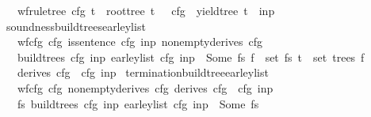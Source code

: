 \begin{isabellebody}
\ \ \ {\isachardoublequoteopen}wf{\isacharunderscore}{\kern0pt}rule{\isacharunderscore}{\kern0pt}tree\ cfg\ t\ {\isasymand}\ root{\isacharunderscore}{\kern0pt}tree\ t\ {\isacharequal}{\kern0pt}\ {\isasymSS}\ cfg\ {\isasymand}\ yield{\isacharunderscore}{\kern0pt}tree\ t\ {\isacharequal}{\kern0pt}\ inp{\isachardoublequoteclose}%
\isadelimproof
%
\endisadelimproof
%
\isatagproof
%
\endisatagproof
{\isafoldproof}%
%
\isadelimproof
\isanewline
%
\endisadelimproof
{}\isamarkupfalse%
\ soundness{\isacharunderscore}{\kern0pt}build{\isacharunderscore}{\kern0pt}trees{\isacharunderscore}{\kern0pt}earley{\isacharunderscore}{\kern0pt}list{\isacharcolon}{\kern0pt}\isanewline
\ \ \ {\isachardoublequoteopen}wf{\isacharunderscore}{\kern0pt}cfg\ cfg{\isachardoublequoteclose}\ {\isachardoublequoteopen}is{\isacharunderscore}{\kern0pt}sentence\ cfg\ inp{\isachardoublequoteclose}\ {\isachardoublequoteopen}nonempty{\isacharunderscore}{\kern0pt}derives\ cfg{\isachardoublequoteclose}\isanewline
\ \ \ {\isachardoublequoteopen}build{\isacharunderscore}{\kern0pt}trees\ cfg\ inp\ {\isacharparenleft}{\kern0pt}earley{\isacharunderscore}{\kern0pt}list\ cfg\ inp{\isacharparenright}{\kern0pt}\ {\isacharequal}{\kern0pt}\ Some\ fs{\isachardoublequoteclose}\ {\isachardoublequoteopen}f\ {\isasymin}\ set\ fs{\isachardoublequoteclose}\ {\isachardoublequoteopen}t\ {\isasymin}\ set\ {\isacharparenleft}{\kern0pt}trees\ f{\isacharparenright}{\kern0pt}{\isachardoublequoteclose}\isanewline
\ \ \ {\isachardoublequoteopen}derives\ cfg\ {\isacharbrackleft}{\kern0pt}{\isasymSS}\ cfg{\isacharbrackright}{\kern0pt}\ inp{\isachardoublequoteclose}%
\isadelimproof
%
\endisadelimproof
%
\isatagproof
%
\endisatagproof
{\isafoldproof}%
%
\isadelimproof
\isanewline
%
\endisadelimproof
{}\isamarkupfalse%
\ termination{\isacharunderscore}{\kern0pt}build{\isacharunderscore}{\kern0pt}tree{\isacharunderscore}{\kern0pt}earley{\isacharunderscore}{\kern0pt}list{\isacharcolon}{\kern0pt}\isanewline
\ \ \ {\isachardoublequoteopen}wf{\isacharunderscore}{\kern0pt}cfg\ cfg{\isachardoublequoteclose}\ {\isachardoublequoteopen}nonempty{\isacharunderscore}{\kern0pt}derives\ cfg{\isachardoublequoteclose}\ {\isachardoublequoteopen}derives\ cfg\ {\isacharbrackleft}{\kern0pt}{\isasymSS}\ cfg{\isacharbrackright}{\kern0pt}\ inp{\isachardoublequoteclose}\isanewline
\ \ \ {\isachardoublequoteopen}{\isasymexists}fs{\isachardot}{\kern0pt}\ build{\isacharunderscore}{\kern0pt}trees\ cfg\ inp\ {\isacharparenleft}{\kern0pt}earley{\isacharunderscore}{\kern0pt}list\ cfg\ inp{\isacharparenright}{\kern0pt}\ {\isacharequal}{\kern0pt}\ Some\ fs{\isachardoublequoteclose}%
\isadelimproof
%
\endisadelimproof
%
\isatagproof
%
\endisatagproof
{\isafoldproof}%
%
\isadelimproof
%
\endisadelimproof
%
\isadelimdocument
%
\endisadelimdocument
%
\isatagdocument
%
\isamarkuptrue%
%
\endisatagdocument
{\isafolddocument}%
%
\isadelimdocument
%
\endisadelimdocument
%
\isadelimtheory
%
\endisadelimtheory
%
\isatagtheory
%
\endisatagtheory
{\isafoldtheory}%
%
\isadelimtheory
%
\endisadelimtheory
%
\end{isabellebody}%
